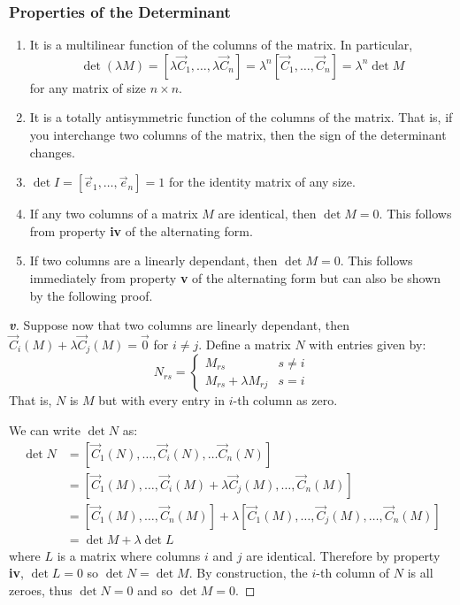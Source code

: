 \documentclass[../main.tex]{subfiles}
\begin{document}
\subsubsection{Properties of the Determinant}
\begin{enumerate}
  \item It is a multilinear function of the columns of the matrix.
    In particular,
    \[
      \det (\lambda M)  = [\lambda \vec{C}_1, \ldots, \lambda \vec{C}_n] = \lambda^{n} [\vec{C}_1, \ldots, \vec{C}_n] = \lambda^{n}\det M
    \]
    for any matrix of size $n \times n$.
  \item It is a totally antisymmetric function of the columns of the matrix.
    That is, if you interchange two columns of the matrix, then the sign of the determinant changes.
  \item $\det I = [\vec{e}_1, \ldots, \vec{e}_n] = 1$ for the identity matrix of any size.
  \item If any two columns of a matrix $M$ are identical, then $\det M = 0$.
    This follows from property \textbf{iv} of the alternating form.
  \item If two columns are a linearly dependant, then $\det M = 0$.
    This follows immediately from property \textbf{v} of the alternating form but can also be shown by the following proof.
\end{enumerate}
\begin{proof}[\textbf{v}]
  Suppose now that two columns are linearly dependant, then $\vec{C}_i(M) + \lambda \vec{C}_j(M) = \vec{0}$ for $i \neq j$.
  Define a matrix $N$ with entries given by:
  \[
    N_{r s} = \begin{cases}
    M_{r s} &  s \neq i \\
    M_{r s} + \lambda M_{r j} & s = i
    \end{cases}
  \]
  That is, $N$ is $M$ but with every entry in $i$-th column as zero.

  We can write $\det N$ as:
  \begin{align*}
    \det N &= [\vec{C}_1(N), \ldots, \vec{C}_i(N), \ldots \vec{C}_n(N)] \\
           &= [\vec{C}_1(M), \ldots, \vec{C}_i(M) + \lambda \vec{C}_j(M), \ldots, \vec{C}_n(M)] \\
           &= [\vec{C}_1(M), \ldots, \vec{C}_n(M)] + \lambda [\vec{C}_1(M), \ldots, \vec{C}_j(M), \ldots, \vec{C}_n(M)] \\
           &= \det M + \lambda \det L
  \end{align*}
  where $L$ is a matrix where columns $i$ and $j$ are identical.
  Therefore by property \textbf{iv}, $\det L = 0$ so $\det N = \det M$.
  By construction, the $i$-th column of $N$ is all zeroes, thus $\det N = 0$ and so $\det M = 0$.
\end{proof}
\end{document}
